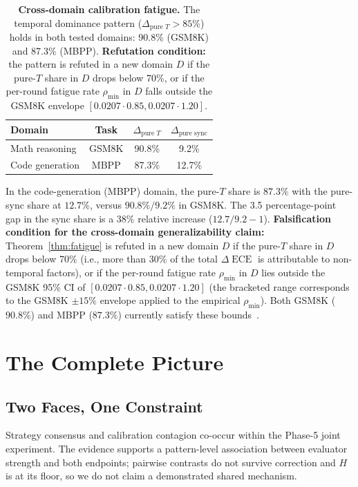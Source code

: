 \documentclass[11pt]{article}
\DeclareMathOperator{\ECE}{ECE}
\begin{document}
\begin{table}[H]
\centering
\caption{\textbf{Cross-domain calibration fatigue.} The temporal dominance pattern ($\Delta_{\text{pure } T} > 85\%$) holds in both tested domains: 90.8\% (GSM8K) and 87.3\% (MBPP). \textbf{Refutation condition:} the pattern is refuted in a new domain $D$ if the pure-$T$ share in $D$ drops below 70\%, or if the per-round fatigue rate $\rho_{\min}$ in $D$ falls outside the GSM8K envelope $[0.0207 \cdot 0.85, 0.0207 \cdot 1.20]$.}
\begin{tabular}{@{}lccc@{}}
\toprule
Domain & Task & $\Delta_{\text{pure } T}$ & $\Delta_{\text{pure sync}}$ \\
\midrule
Math reasoning & GSM8K & 90.8\% & 9.2\% \\
Code generation & MBPP & 87.3\% & 12.7\% \\
\bottomrule
\end{tabular}
\end{table}

In the code-generation (MBPP) domain, the pure-$T$ share is $87.3\%$ with the pure-sync share at $12.7\%$, versus $90.8\% / 9.2\%$ in GSM8K. The 3.5 percentage-point gap in the sync share is a 38\% relative increase ($12.7 / 9.2 - 1$). \textbf{Falsification condition for the cross-domain generalizability claim:} Theorem~\ref{thm:fatigue} is refuted in a new domain $D$ if the pure-$T$ share in $D$ drops below 70\% (i.e., more than 30\% of the total $\Delta\ECE$ is attributable to non-temporal factors), or if the per-round fatigue rate $\rho_{\min}$ in $D$ lies outside the GSM8K 95\% CI of $[0.0207 \cdot 0.85, 0.0207 \cdot 1.20]$ (the bracketed range corresponds to the GSM8K $\pm 15\%$ envelope applied to the empirical $\rho_{\min}$). Both GSM8K ($90.8\%$) and MBPP ($87.3\%$) currently satisfy these bounds~\citep{sun2020test,temporal2026}.

\section{The Complete Picture}

\subsection{Two Faces, One Constraint}

Strategy consensus and calibration contagion co-occur within the Phase-5 joint experiment. The evidence supports a pattern-level association between evaluator strength and both endpoints; pairwise contrasts do not survive correction and $H$ is at its floor, so we do not claim a demonstrated shared mechanism.
\end{document}
